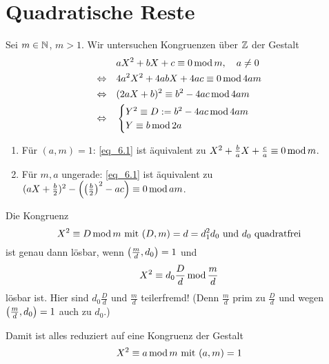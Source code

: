 \section{Quadratische Reste}
\label{sec:para6}

	Sei $m \in \NN$, $m > 1$. Wir untersuchen Kongruenzen über $\ZZ$ der Gestalt
	\begin{align}
		& aX^2 + bX + c \kon 0 \modu m, \quad a \neq 0 \label{eq_6.1} \\ 
		\Leftrightarrow \quad & 4a^2X^2 + 4abX + 4ac \kon 0 \modu 4am \\ 
		\Leftrightarrow \quad & (2aX + b)^2 \kon b^2 - 4ac \modu 4am \label{eq_6.2} \\ 
		\Leftrightarrow \quad & \begin{cases}
			Y^2 \kon D := b^2 - 4ac \modu 4am \\
			Y \kon b \modu 2a
		\end{cases} \label{eq_6.3}
	\end{align}

	\begin{enumerate}[1)]
		\item Für $(a,m) = 1$: \eqref{eq_6.1} ist äquivalent zu $X^2 + \frac{b}{a}X + \frac{c}{a} \kon 0 \modu m$.
		\item Für $m, a$ ungerade: \eqref{eq_6.1} ist äquivalent zu $(aX + \frac{b}{2})^2 - \enbrace*{ \enbrace*{\frac{b}{2}}^2 - ac} \kon 0 \modu am$.
	\end{enumerate}

\begin{falko} \label{F6.1}
	Die Kongruenz
	\begin{equation}
		X^2 \kon D \modu m \text{ mit } (D,m) = d = d_1^2 d_0 \text{ und } d_0 \text{ quadratfrei} \label{eq_6.4}
	\end{equation}
	ist genau dann lösbar, wenn $\enbrace*{\frac{m}{d},d_0} = 1$ und
	\begin{equation}
		X^2 \kon d_0 \frac{D}{d} \modu \frac{m}{d} \label{eq_6.5}
	\end{equation}
	lösbar ist. Hier sind $d_0 \frac{D}{d}$ und $\frac{m}{d}$ teilerfremd! (Denn $\frac{m}{d}$ prim zu $\frac{D}{d}$ und wegen $\enbrace*{\frac{m}{d},d_0} = 1$ auch zu $d_0$.)
\end{falko}

Damit ist alles reduziert auf eine Kongruenz der Gestalt
\begin{equation}
	X^2 \kon a \modu m \text{ mit } (a,m) = 1 \label{eq_6_stern}
\end{equation}

